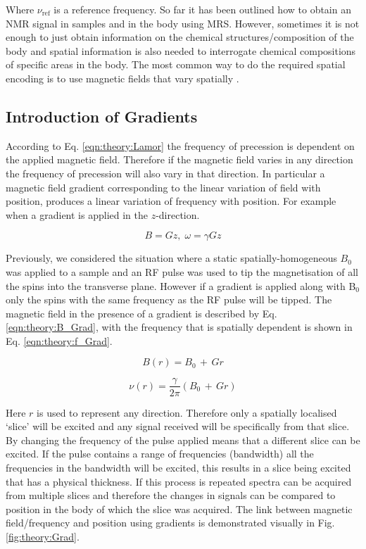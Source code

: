 Where $\nu_{\textrm{ref}}$ is a reference frequency. So far it has been outlined how to obtain an \ac{NMR} signal in samples and in the body using MRS. However, sometimes it is not enough to just obtain information on the chemical structures/composition of the body and spatial information is also needed to interrogate chemical compositions of specific areas in the body. The most common way to do the required spatial encoding is to use magnetic fields that vary spatially \cite{Haacke2014MagneticDesign}. 

\subsection{Introduction of Gradients}

According to Eq. \ref{eqn:theory:Lamor} the frequency of precession is dependent on the applied magnetic field. Therefore if the magnetic field varies in any direction the frequency of precession will also vary in that direction. In particular a magnetic field gradient corresponding to the linear variation of field with position, produces a linear variation of frequency with position. For example when a gradient is applied in the $z$-direction.

\begin{equation}
    B = Gz,\; \omega = \gamma Gz 
\end{equation}

Previously, we considered the situation where a static spatially-homogeneous $B_0$ was applied to a sample and an \ac{RF} pulse was used to tip the magnetisation of all the spins into the transverse plane. However if a gradient is applied along with B$_0$ only the spins with the same frequency as the \ac{RF} pulse will be tipped. The magnetic field in the presence of a gradient is described by Eq. \ref{eqn:theory:B_Grad}, with the frequency that is spatially dependent is shown in Eq. \ref{eqn:theory:f_Grad}.

\begin{equation}
    B(r) = B_0 \, + \, Gr
    \label{eqn:theory:B_Grad}
\end{equation}

\begin{equation}
    \nu(r) = \frac{\gamma}{2\pi}(B_0 \, + \, Gr)
    \label{eqn:theory:f_Grad}
\end{equation}

\noindent Here $r$ is used to represent any direction. Therefore only a spatially localised `slice' will be excited and any signal received will be specifically from that slice. By changing the frequency of the pulse applied means that a different slice can be excited. If the pulse contains a range of frequencies (bandwidth) all the frequencies in the bandwidth will be excited, this results in a slice being excited that has a physical thickness. If this process is repeated spectra can be acquired from multiple slices and therefore the changes in signals can be compared to position in the body of which the slice was acquired. The link between magnetic field/frequency and position using gradients is demonstrated visually in Fig. \ref{fig:theory:Grad}.

